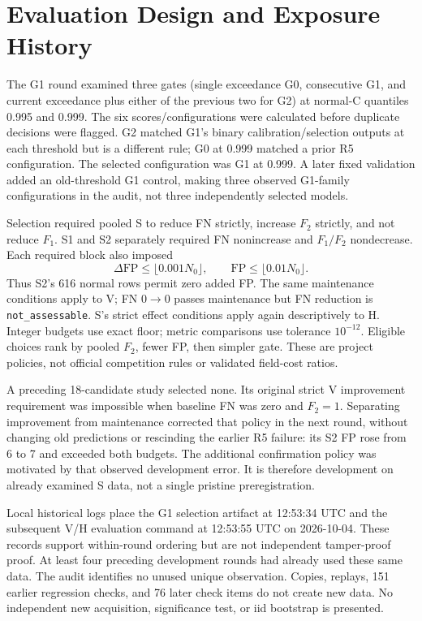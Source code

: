 \documentclass{article}
\begin{document}
\section{Evaluation Design and Exposure History}
The G1 round examined three gates (single exceedance G0, consecutive G1, and current exceedance plus either of the previous two for G2) at normal-C quantiles 0.995 and 0.999. The six scores/configurations were calculated before duplicate decisions were flagged. G2 matched G1's binary calibration/selection outputs at each threshold but is a different rule; G0 at 0.999 matched a prior R5 configuration. The selected configuration was G1 at 0.999. A later fixed validation added an old-threshold G1 control, making three observed G1-family configurations in the audit, not three independently selected models.

Selection required pooled S to reduce FN strictly, increase $F_2$ strictly, and not reduce $F_1$. S1 and S2 separately required FN nonincrease and $F_1/F_2$ nondecrease. Each required block also imposed
\begin{equation}
 \Delta\mathrm{FP}\leq\lfloor0.001N_0\rfloor,\qquad
 \mathrm{FP}\leq\lfloor0.01N_0\rfloor.
\end{equation}
Thus S2's 616 normal rows permit zero added FP. The same maintenance conditions apply to V; FN $0\to0$ passes maintenance but FN reduction is \texttt{not\_assessable}. S's strict effect conditions apply again descriptively to H. Integer budgets use exact floor; metric comparisons use tolerance $10^{-12}$. Eligible choices rank by pooled $F_2$, fewer FP, then simpler gate. These are project policies, not official competition rules or validated field-cost ratios.

A preceding 18-candidate study selected none. Its original strict V improvement requirement was impossible when baseline FN was zero and $F_2=1$. Separating improvement from maintenance corrected that policy in the next round, without changing old predictions or rescinding the earlier R5 failure: its S2 FP rose from 6 to 7 and exceeded both budgets. The additional confirmation policy was motivated by that observed development error. It is therefore development on already examined S data, not a single pristine preregistration.

Local historical logs place the G1 selection artifact at 12:53:34 UTC and the subsequent V/H evaluation command at 12:53:55 UTC on 2026-10-04. These records support within-round ordering but are not independent tamper-proof proof. At least four preceding development rounds had already used these same data. The audit identifies no unused unique observation. Copies, replays, 151 earlier regression checks, and 76 later check items do not create new data. No independent new acquisition, significance test, or iid bootstrap is presented.
\end{document}
